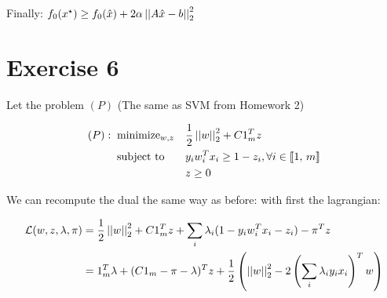 \documentclass{article}
\begin{document}
Finally: $f_0(x^\star) \ge f_0(\hat{x}) + 2\alpha \left|\left| A\hat{x} - b \right|\right|_2^2$

\section{Exercise 6}

Let the problem $(P)$ (The same as SVM from Homework 2)


\begin{equation*}
    \begin{aligned}
        (P):\;\; & \text{minimize}_{w, z} &  & \frac{1}{2}\left|\left| w \right|\right|_2^2 + C1_m^Tz                    \\
                 & \text{subject to}      &  & y_i w_i^Tx_i \ge 1 - z_i, \forall i \in \left\llbracket1,\, m\right\rrbracket \\
                 &                        &  & z \ge 0                                              \\
    \end{aligned}
\end{equation*}

We can recompute the dual the same way as before: with first the lagrangian:

\begin{equation*}
    \begin{aligned}
        \mathcal{L}(w, z, \lambda, \pi) & = \frac{1}{2}\left|\left| w \right|\right|_2^2 + C1_m^Tz + \sum_i\lambda_i (1 - y_i w_i^T x_i - z_i) - \pi^Tz                                           \\
                                        & = 1_m^T\lambda + (C1_m - \pi - \lambda)^Tz + \frac{1}{2} \left( \left|\left| w \right|\right|_2^2 - 2 \left(\sum_i \lambda_i y_i x_i\right)^T w \right) \\
    \end{aligned}
\end{equation*}
\end{document}
